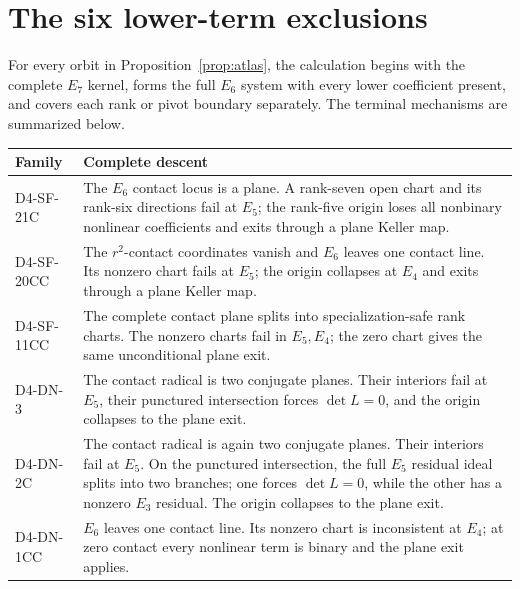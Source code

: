 \documentclass[11pt]{article}
\begin{document}
\section{The six lower-term exclusions}

For every orbit in Proposition~\ref{prop:atlas}, the calculation begins
with the complete \(E_7\) kernel, forms the full \(E_6\) system with every
lower coefficient present, and covers each rank or pivot boundary
separately.  The terminal mechanisms are summarized below.

\begin{center}
\small
\begin{tabular}{@{}>{\ttfamily}l p{}@{}}
\toprule
\normalfont Family & \normalfont Complete descent\\
\midrule
D4-SF-21C &
The \(E_6\) contact locus is a plane.  A rank-seven open chart and its
rank-six directions fail at \(E_5\); the rank-five origin loses all
nonbinary nonlinear coefficients and exits through a plane Keller map.\\
D4-SF-20CC &
The \(r^2\)-contact coordinates vanish and \(E_6\) leaves one contact
line.  Its nonzero chart fails at \(E_5\); the origin collapses at \(E_4\)
and exits through a plane Keller map.\\
D4-SF-11CC &
The complete contact plane splits into specialization-safe rank charts.
The nonzero charts fail in \(E_5,E_4\); the zero chart gives the same
unconditional plane exit.\\
D4-DN-3 &
The contact radical is two conjugate planes.  Their interiors fail at
\(E_5\), their punctured intersection forces \(\det L=0\), and the origin
collapses to the plane exit.\\
D4-DN-2C &
The contact radical is again two conjugate planes.  Their interiors fail
at \(E_5\).  On the punctured intersection, the full \(E_5\) residual
ideal splits into two branches; one forces \(\det L=0\), while the other
has a nonzero \(E_3\) residual.  The origin collapses to the plane exit.\\
D4-DN-1CC &
\(E_6\) leaves one contact line.  Its nonzero chart is inconsistent at
\(E_4\); at zero contact every nonlinear term is binary and the plane exit
applies.\\
\bottomrule
\end{tabular}
\end{center}
\end{document}
